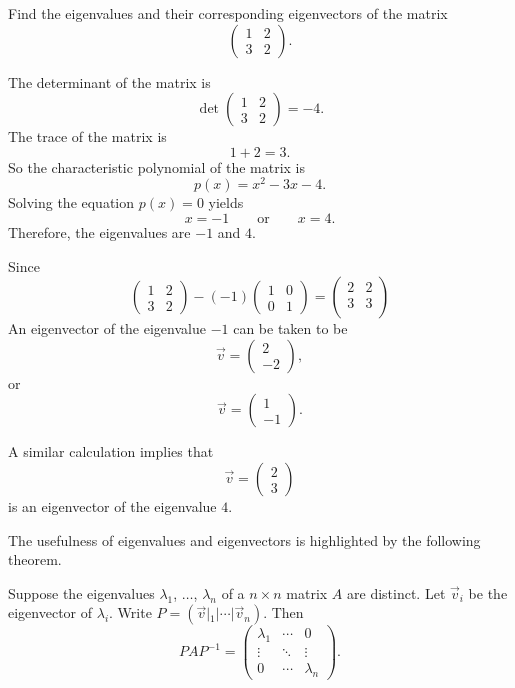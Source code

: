 \begin{example}
  Find the eigenvalues and their corresponding eigenvectors of the matrix
  \[
  \begin{pmatrix}
    1 & 2 \\
    3 & 2
  \end{pmatrix}.  
  \]
\end{example}
\begin{solution}
  The determinant of the matrix is
  \[
    \det\begin{pmatrix}
      1 & 2 \\
      3 & 2
    \end{pmatrix}=-4.  
  \]
  The trace of the matrix is
  \[1+2=3.\]
  So the characteristic polynomial of the matrix is
  \[
  p(x)=x^2-3x-4. 
  \]
  Solving the equation $p(x)=0$ yields
  \[
    x=-1 \qquad\text{or}\qquad x=4.
  \]
  Therefore, the eigenvalues are $-1$ and $4$.

  Since
  \[
  \begin{pmatrix}
    1 & 2 \\
    3 & 2
  \end{pmatrix}  - (-1)
  \begin{pmatrix}
    1 & 0\\
    0 & 1
  \end{pmatrix}=
  \begin{pmatrix}
    2 & 2\\
    3 & 3\\
  \end{pmatrix}
  \]
  An eigenvector of the eigenvalue $-1$ can be taken to be
  \[\vec{v}=\begin{pmatrix}
 2\\ -2   
  \end{pmatrix},
  \]
  or 
  \[\vec{v}=\begin{pmatrix}
    1\\ -1   
     \end{pmatrix}.
     \]

  A similar calculation implies that
  \[\vec{v}=\begin{pmatrix}
    2\\ 3   
     \end{pmatrix}\]
 is an eigenvector of the eigenvalue $4$.
\end{solution}

The usefulness of eigenvalues and eigenvectors is highlighted by the following theorem.

\begin{theorem}
  Suppose the eigenvalues $\lambda_1$, $\dots$, $\lambda_n$ of a $n\times n$ matrix $A$ are distinct. Let $\vec{v}_i$ be the eigenvector of $\lambda_i$. Write $P=(\vec{v}|_1|\cdots |\vec{v}_n)$. Then
  \[
    PAP^{-1}=
  \begin{pmatrix}
    \lambda_1 & \cdots & 0\\
    \vdots & \ddots & \vdots\\
    0 & \cdots & \lambda_n
  \end{pmatrix}.
  \] 
\end{theorem}

